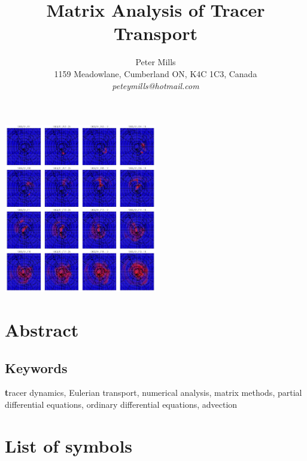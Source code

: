 \documentclass[11pt]{article}
\begin{document}
\def\interesting{Include Volume deformation vs. transport map section}

\title{Matrix Analysis of Tracer Transport}
\author{Peter Mills\\
1159 Meadowlane, Cumberland ON, K4C 1C3, Canada\\
\textit{peteymills@hotmail.com}}

\maketitle

\begin{center}
\includegraphics[width=0.5\textwidth]{tt_cover_graphic}
\end{center}

\pagestyle{myheadings}

\section*{Abstract}

	

\subsection*{Keywords}
{\textbf tracer dynamics, Eulerian transport, numerical analysis, matrix methods, partial differential equations, ordinary differential equations, advection}

\tableofcontents



\section*{List of symbols}



\newpage


\end{document}
